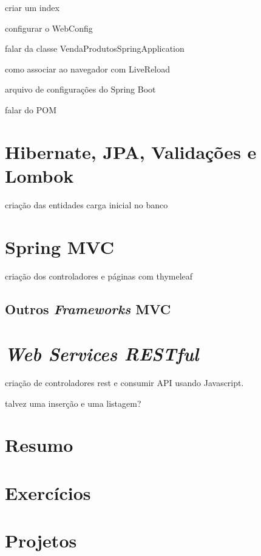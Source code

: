 
criar um index

configurar o WebConfig


falar da classe VendaProdutosSpringApplication



como associar ao navegador com LiveReload

arquivo de configurações do Spring Boot

falar do POM


\section{Hibernate, JPA, Validações e Lombok}

criação das entidades
carga inicial no banco


\section{Spring MVC}

criação dos controladores e páginas com thymeleaf


\subsection{Outros \textit{Frameworks} MVC}



\section{\textit{Web Services RESTful}}

criação de controladores rest e consumir API usando Javascript.

talvez uma inserção e uma listagem?


\section{Resumo}

\section{Exercícios}

\section{Projetos}
